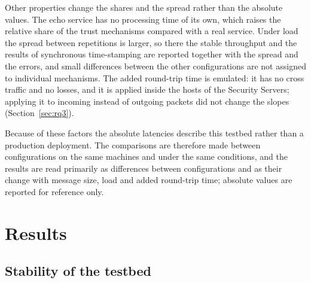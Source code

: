 \documentclass[conference,a4paper]{IEEEtran}
\begin{document}
Other properties change the shares and the spread rather than the absolute values. The echo service
has no processing time of its own, which raises the relative share of the trust mechanisms compared
with a real service. Under load the spread between repetitions is larger, so there the stable
throughput and the results of synchronous time-stamping are reported together with the spread and
the errors, and small differences between the other configurations are not assigned to individual
mechanisms. The added round-trip time is emulated:
it has no cross traffic and no losses, and it is applied inside the hosts of the Security
Servers; applying it to incoming instead of outgoing packets did not change the slopes
(Section~\ref{sec:rq3}).

Because of these factors the absolute latencies describe this testbed rather than a production
deployment. The comparisons are therefore made between configurations on the same machines and
under the same conditions, and the results are read primarily as differences between configurations
and as their change with message size, load and added round-trip time; absolute values are reported for
reference only.

\section{Results}

\subsection{Stability of the testbed}
\end{document}

